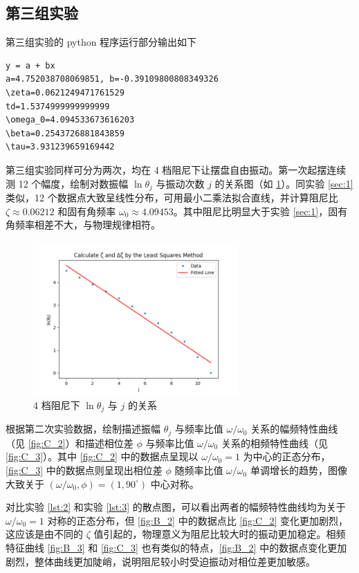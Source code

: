 \documentclass[12pt,a4paper]{amsart}
\begin{document}
\subsection{第三组实验}

第三组实验的 python 程序运行部分输出如下

\begin{lstlisting}[label={lst:3}, caption={第三组实验数据处理结果}]
y = a + bx
a=4.752038708069851, b=-0.39109800808349326
\zeta=0.0621249471761529
td=1.5374999999999999
\omega_0=4.094533673616203
\beta=0.2543726881843859
\tau=3.931239659169442
\end{lstlisting}

第三组实验同样可分为两次，均在 4 档阻尼下让摆盘自由振动。第一次起摆连续测 12 个幅度，绘制对数振幅 $\ln\theta_j$ 与振动次数 $j$ 的关系图（如 \ref{fig:C_1}）。同实验 \ref{sec:1} 类似，12 个数据点大致呈线性分布，可用最小二乘法拟合直线，并计算阻尼比 $\zeta \approx 0.06212$ 和固有角频率 $\omega_0 \approx 4.09453$。其中阻尼比明显大于实验 \ref{sec:1}，固有角频率相差不大，与物理规律相符。

\begin{figure}[H]
	\centering
	\includegraphics[width=0.7\textwidth]{img/C_1.png}
	\caption{4 档阻尼下 $\ln\theta_j$ 与 $j$ 的关系}
	\label{fig:C_1}
\end{figure}

根据第二次实验数据，绘制描述振幅 $\theta_j$ 与频率比值 $\omega/\omega_0$ 关系的幅频特性曲线（见 \ref{fig:C_2}）和描述相位差 $\phi$ 与频率比值 $\omega/\omega_0$ 关系的相频特性曲线（见 \ref{fig:C_3}）。其中 \ref{fig:C_2} 中的数据点呈现以 $\omega/\omega_0 = 1$ 为中心的正态分布，\ref{fig:C_3} 中的数据点则呈现出相位差 $\phi$ 随频率比值 $\omega/\omega_0$ 单调增长的趋势，图像大致关于 $(\omega/\omega_0, \phi) = (1, 90^\circ)$ 中心对称。

对比实验 \ref{lst:2} 和实验 \ref{lst:3} 的散点图，可以看出两者的幅频特性曲线均为关于 $\omega/\omega_0 = 1$ 对称的正态分布，但 \ref{fig:B_2} 中的数据点比 \ref{fig:C_2} 变化更加剧烈，这应该是由不同的 $\zeta$ 值引起的，物理意义为阻尼比较大时的振动更加稳定。相频特征曲线 \ref{fig:B_3} 和 \ref{fig:C_3} 也有类似的特点，\ref{fig:B_2} 中的数据点变化更加剧烈，整体曲线更加陡峭，说明阻尼较小时受迫振动对相位差更加敏感。
\end{document}
